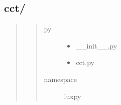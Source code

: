 \documentclass[letterpaper,10pt,english]{sphinxmanual}
\begin{document}
\subsection{cct/}
\label{\detokenize{color:cct}}\begin{quote}
\begin{quote}\begin{description}
\item[{py}] \leavevmode\begin{itemize}
\item {} 
\_\_init\_\_.py

\item {} 
cct.py

\end{itemize}

\item[{namespace}] \leavevmode
luxpy

\end{description}\end{quote}
\end{quote}
\label{\detokenize{color:module-luxpy.color.cct}}
\end{document}
